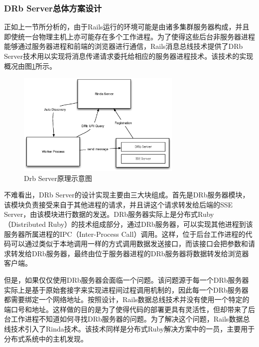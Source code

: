 \subsubsection{DRb Server总体方案设计}

正如上一节所分析的，由于Rails运行的环境可能是由诸多集群服务器构成，并且即使统一台物理主机上亦可能存在多个工作进程。为了使得这些后台非服务器进程能够通过服务器进程和前端的浏览器进行通信，Rails消息总线技术提供了DRb Server技术用以实现将消息传递请求委托给相应的服务器进程技术。该技术的实现概况由图\ref{fig-drb}所示。

\begin{figure}[h]
\centering
\includegraphics[width=0.7\textwidth]{images/overview/drb.eps}
\caption{Drb Server原理示意图}
\label{fig-drb}
\end{figure}

不难看出，DRb Server的设计实现主要由三大块组成。首先是DRb服务器模块，该模块负责接受来自于其他进程的请求，并且讲这个请求转发给后端的SSE Server，由该模块进行数据的发送。DRb服务器实际上是分布式Ruby（Distributed Ruby）的技术组成部分，通过DRb服务器，可以实现其他进程到该服务器所属进程的IPC（Inter-Process Call）调用。这样，位于后台工作进程的代码可以通过类似于本地调用一样的方式调用数据发送接口，而该接口会把参数和请求转发给DRb服务器，最终由位于服务器进程的DRb服务器将数据转发给浏览器客户端。

但是，如果仅仅使用DRb服务器会面临一个问题。该问题源于每一个DRb服务器实际上是基于原始套接字来实现进程间过程调用机制的，因此每一个DRb服务器都需要绑定一个网络地址。按照设计，Rails数据总线技术并没有使用一个特定的端口号和地址。这样做的目的是为了使得代码的部署更具有灵活性，但却带来了后台工作进程不知道如何寻找DRb服务器的问题。为了解决这个问题，Rails数据总线技术引入了Rinda技术。该技术同样是分布式Ruby解决方案中的一员，主要用于分布式系统中的主机发现。

